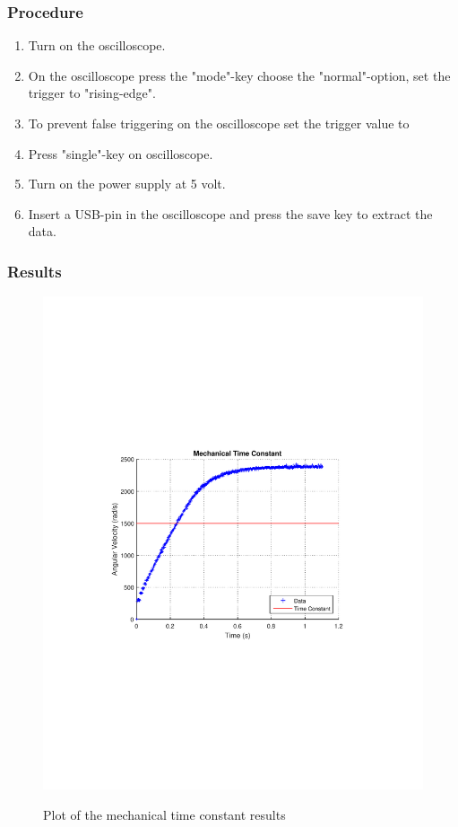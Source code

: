 \subsubsection{Procedure}

\begin{enumerate}
  \item Turn on the oscilloscope.
  \item On the oscilloscope press the "mode"-key choose the "normal"-option, set the trigger to "rising-edge".
  \item To prevent false triggering on the oscilloscope set the trigger value to %
  \item Press "single"-key on oscilloscope.
  \item Turn on the power supply at 5 volt.
  \item Insert a USB-pin in the oscilloscope and press the save key to extract the data.
\end{enumerate}

\subsubsection{Results}

\begin{figure}[H]
  \centering
  {
    \includegraphics[width=.8\textwidth]{figures/mechanicalTimeConstant.pdf}
  }
	\caption{Plot of the mechanical time constant results}
	\label{mechanicalTimeConstant}
\end{figure}

